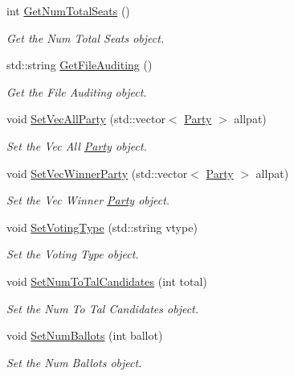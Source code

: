 \begin{DoxyCompactItemize}
int \hyperlink{classReport_a6a368d1b0ab54c2f50e76d56f9837f18}{Get\+Num\+Total\+Seats} ()
\begin{DoxyCompactList}\small\item\em Get the Num Total Seats object. \end{DoxyCompactList}\item 
std\+::string \hyperlink{classReport_a7c133617616e36a1a802260967d0bf96}{Get\+File\+Auditing} ()
\begin{DoxyCompactList}\small\item\em Get the File Auditing object. \end{DoxyCompactList}\item 
void \hyperlink{classReport_a7bb4a631240a73a3cad94c13b15aa10c}{Set\+Vec\+All\+Party} (std\+::vector$<$ \hyperlink{classParty}{Party} $>$ allpat)
\begin{DoxyCompactList}\small\item\em Set the Vec All \hyperlink{classParty}{Party} object. \end{DoxyCompactList}\item 
void \hyperlink{classReport_a6b6f72448fe80a4865eb90630ebff6d8}{Set\+Vec\+Winner\+Party} (std\+::vector$<$ \hyperlink{classParty}{Party} $>$ allpat)
\begin{DoxyCompactList}\small\item\em Set the Vec Winner \hyperlink{classParty}{Party} object. \end{DoxyCompactList}\item 
void \hyperlink{classReport_a803f4835f3ae218eed411f18f48b7590}{Set\+Voting\+Type} (std\+::string vtype)
\begin{DoxyCompactList}\small\item\em Set the Voting Type object. \end{DoxyCompactList}\item 
void \hyperlink{classReport_a5e2b915fae64358202460250b73dbb46}{Set\+Num\+To\+Tal\+Candidates} (int total)
\begin{DoxyCompactList}\small\item\em Set the Num To Tal Candidates object. \end{DoxyCompactList}\item 
void \hyperlink{classReport_a0277f54bdd8aea6634b9e775382d2eb3}{Set\+Num\+Ballots} (int ballot)
\begin{DoxyCompactList}\small\item\em Set the Num Ballots object. \end{DoxyCompactList}\item 

\end{DoxyCompactItemize}

